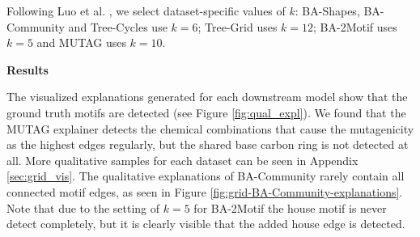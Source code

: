 Following Luo et al. \cite{luo2020parameterized}, we select dataset-specific values of $k$: BA-Shapes, BA-Community and Tree-Cycles use $k=6$; Tree-Grid uses $k=12$; BA-2Motif uses $k=5$ and MUTAG uses $k=10$. \bigskip

\textbf{Results}\par
The visualized explanations generated for each downstream model show that the ground truth motifs are detected (see Figure \ref{fig:qual_expl}).
We found that the MUTAG explainer detects the chemical combinations that cause the mutagenicity as the highest edges regularly, but the shared base carbon ring is not detected at all. More qualitative samples for each dataset can be seen in Appendix \ref{sec:grid_vis}. The qualitative explanations of BA-Community rarely contain all connected motif edges, as seen in Figure \ref{fig:grid-BA-Community-explanations}. Note that due to the setting of $k=5$ for BA-2Motif the house motif is never detect completely, but it is clearly visible that the added house edge is detected.

